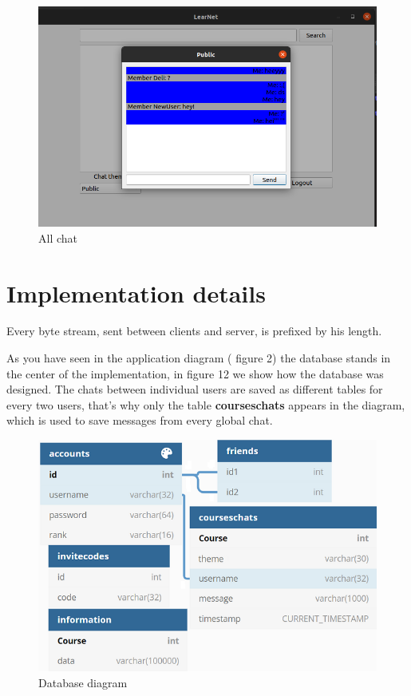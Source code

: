 \documentclass[runningheads]{llncs}
\begin{document}
\begin{figure}[H]
\includegraphics[width=\textwidth,height=\textheight,keepaspectratio]{images/allchat.png}
\caption{All chat}
\end{figure}

\newpage
\section{Implementation details}
\par Every byte stream, sent between clients and server, is prefixed by his length.  
\par As you have seen in the application diagram ( figure 2) the database stands in the center of the implementation, in figure 12 we show how the database was designed. The chats between individual users are saved as different tables for every two users, that's why only the table \textbf{courseschats} appears in the diagram, which is used to save messages from every global chat.

\begin{figure}[H]
\includegraphics[]{images/dbdiagram.png}
\caption{Database diagram}
\end{figure}
\end{document}
